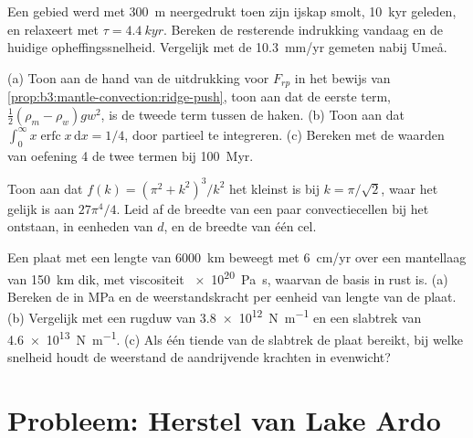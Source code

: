 \begin{exercise}[$\star\star$]\label{exo:b3:mantle-convection:9}
Een gebied werd met \qty{300}{m} neergedrukt toen zijn ijskap smolt, \qty{10}{kyr} geleden,
en relaxeert met $\tau = \qty{4.4}{kyr}$. Bereken de resterende indrukking vandaag en
de huidige opheffingssnelheid. Vergelijk met de \qty{10.3}{mm/yr} gemeten nabij
Umeå.
\end{exercise}

\begin{exercise}[$\star\star\star$]\label{exo:b3:mantle-convection:10}
(a) Toon aan de hand van de uitdrukking voor $F_{rp}$ in het bewijs van
\cref{prop:b3:mantle-convection:ridge-push}, toon aan dat de eerste term,
$\tfrac12(\rho_m - \rho_w)gw^2$, is de tweede term tussen de haken. (b) Toon aan dat
$\int_0^\infty x\operatorname{erfc}x\,\mathrm dx = 1/4$, door partieel te integreren.
(c) Bereken met de waarden van oefening 4 de twee termen bij \qty{100}{Myr}.
\end{exercise}

\begin{exercise}[$\star\star\star$]\label{exo:b3:mantle-convection:11}
Toon aan dat $f(k) = (\pi^2 + k^2)^3/k^2$ het kleinst is bij $k = \pi/\sqrt2$, waar
het gelijk is aan $27\pi^4/4$. Leid af de breedte van een paar convectiecellen bij
het ontstaan, in eenheden van $d$, en de breedte van één cel.
\end{exercise}

\begin{exercise}[$\star\star\star$]\label{exo:b3:mantle-convection:12}
Een plaat met een lengte van \qty{6000}{km} beweegt met \qty{6}{cm/yr} over een mantellaag
van \qty{150}{km} dik, met viscositeit \qty{e20}{Pa.s}, waarvan de basis in rust is. (a)
Bereken de  in \unit{MPa} en de weerstandskracht per eenheid van lengte van de plaat.
(b) Vergelijk met een rugduw van \qty{3.8e12}{N.m^{-1}} en een slabtrek van
\qty{4.6e13}{N.m^{-1}}. (c) Als één tiende van de slabtrek de plaat bereikt,
bij welke snelheid houdt de weerstand de aandrijvende krachten in evenwicht?
\end{exercise}

\section{Probleem: Herstel van Lake Ardo}

